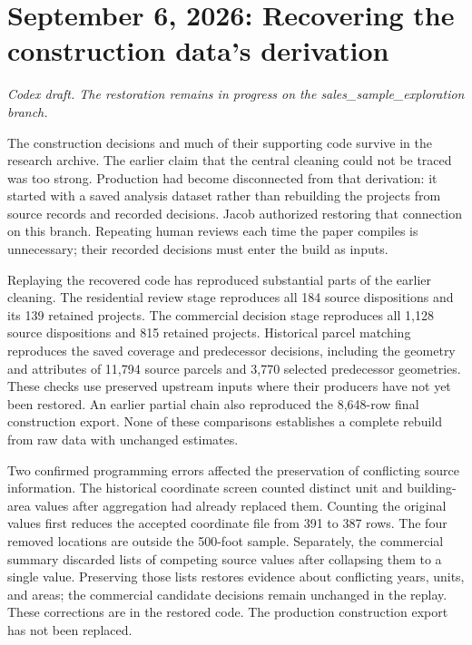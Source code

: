 \section*{September 6, 2026: Recovering the construction data's derivation}
\textit{Codex draft. The restoration remains in progress on the sales\_sample\_exploration branch.}

The construction decisions and much of their supporting code survive in the
research archive. The earlier claim that the central cleaning could not be
traced was too strong. Production had become disconnected from that derivation:
it started with a saved analysis dataset rather than rebuilding the projects
from source records and recorded decisions. Jacob authorized restoring that
connection on this branch. Repeating human reviews each time the paper compiles
is unnecessary; their recorded decisions must enter the build as inputs.

Replaying the recovered code has reproduced substantial parts of the earlier
cleaning. The residential review stage reproduces all 184 source dispositions
and its 139 retained projects. The commercial decision stage reproduces all
1,128 source dispositions and 815 retained projects. Historical parcel matching
reproduces the saved coverage and predecessor decisions, including the geometry
and attributes of 11,794 source parcels and 3,770 selected predecessor
geometries. These checks use preserved upstream inputs where their producers
have not yet been restored. An earlier partial chain also reproduced the
8,648-row final construction export. None of these comparisons establishes a
complete rebuild from raw data with unchanged estimates.

Two confirmed programming errors affected the preservation of conflicting
source information. The historical coordinate screen counted distinct unit and
building-area values after aggregation had already replaced them. Counting the
original values first reduces the accepted coordinate file from 391 to 387
rows. The four removed locations are outside the 500-foot sample. Separately,
the commercial summary discarded lists of competing source values after
collapsing them to a single value. Preserving those lists restores evidence
about conflicting years, units, and areas; the commercial candidate decisions
remain unchanged in the replay. These corrections are in the restored code.
The production construction export has not been replaced.

